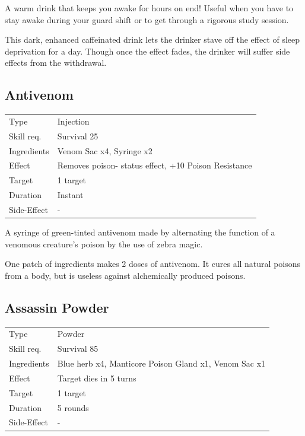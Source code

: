\documentclass[11pt,a4paper,twocolumn]{book}
\begin{document}
A warm drink that keeps you awake for hours on end! Useful when you have to stay awake during your guard shift or to get through a rigorous study session.

This dark, enhanced caffeinated drink lets the drinker stave off the effect of sleep deprivation for a day. Though once the effect fades, the drinker will suffer side effects from the withdrawal.

\vfill


\subsection*{Antivenom}
{
	\begin{tabu} to 75mm{| X[l,4] | X[l,8] |}
		\hline
		Type 			& Injection 												\\
        Skill req.	    & Survival 25 										\\
        Ingredients     & Venom Sac x4, Syringe x2									\\
        Effect     		& Removes poison- status effect, +10 Poison Resistance		\\
        Target      	& 1 target													\\
        Duration  		& Instant	 												\\
        Side-Effect     & -															\\ \hline
	\end{tabu}
		
}

\medskip

A syringe of green-tinted antivenom made by alternating the function of a venomous creature's poison by the use of zebra magic.

One patch of ingredients makes 2 doses of antivenom. It cures all natural poisons from a body, but is useless against alchemically produced poisons.

\vfill


\subsection*{Assassin Powder}
{
	\begin{tabu} to 75mm{| X[l,4] | X[l,8] |}
		\hline
		Type 			& Powder 													\\
        Skill req.	    & Survival 85 												\\
        Ingredients     & Blue herb x4, Manticore Poison Gland x1, Venom Sac x1		\\
        Effect     		& Target dies in 5 turns 									\\
        Target      	& 1 target													\\
        Duration  		& 5 rounds	 												\\
        Side-Effect     & -															\\ \hline
	\end{tabu}
		
}
\end{document}
